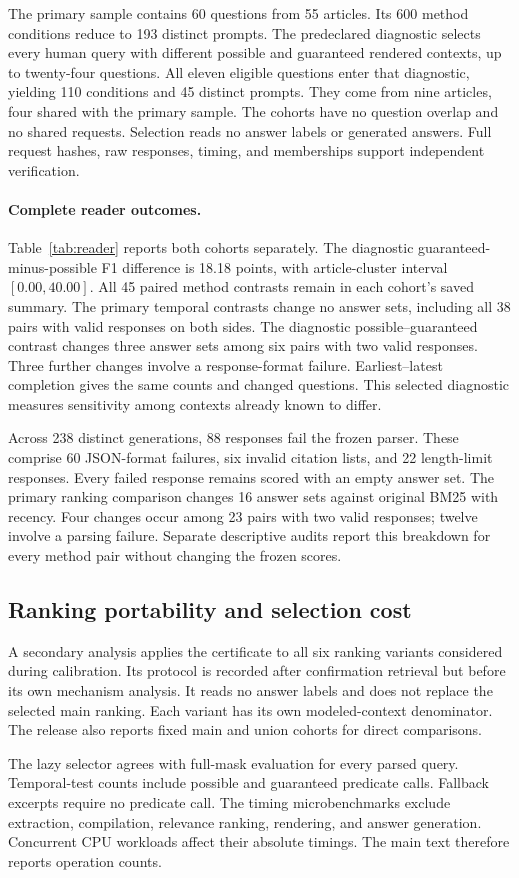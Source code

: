 The primary sample contains 60 questions from 55 articles.
Its 600 method conditions reduce to 193 distinct prompts.
The predeclared diagnostic selects every human query with different possible and guaranteed rendered contexts, up to twenty-four questions.
All eleven eligible questions enter that diagnostic, yielding 110 conditions and 45 distinct prompts.
They come from nine articles, four shared with the primary sample.
The cohorts have no question overlap and no shared requests.
Selection reads no answer labels or generated answers.
Full request hashes, raw responses, timing, and memberships support independent verification.


\paragraph{Complete reader outcomes.}
Table~\ref{tab:reader} reports both cohorts separately.
The diagnostic guaranteed-minus-possible F1 difference is 18.18 points, with article-cluster interval $[0.00,40.00]$.
All 45 paired method contrasts remain in each cohort's saved summary.
The primary temporal contrasts change no answer sets, including all 38 pairs with valid responses on both sides.
The diagnostic possible--guaranteed contrast changes three answer sets among six pairs with two valid responses.
Three further changes involve a response-format failure.
Earliest--latest completion gives the same counts and changed questions.
This selected diagnostic measures sensitivity among contexts already known to differ.

Across 238 distinct generations, 88 responses fail the frozen parser.
These comprise 60 JSON-format failures, six invalid citation lists, and 22 length-limit responses.
Every failed response remains scored with an empty answer set.
The primary ranking comparison changes 16 answer sets against original BM25 with recency.
Four changes occur among 23 pairs with two valid responses; twelve involve a parsing failure.
Separate descriptive audits report this breakdown for every method pair without changing the frozen scores.

\subsection{Ranking portability and selection cost}
A secondary analysis applies the certificate to all six ranking variants considered during calibration.
Its protocol is recorded after confirmation retrieval but before its own mechanism analysis.
It reads no answer labels and does not replace the selected main ranking.
Each variant has its own modeled-context denominator.
The release also reports fixed main and union cohorts for direct comparisons.

The lazy selector agrees with full-mask evaluation for every parsed query.
Temporal-test counts include possible and guaranteed predicate calls.
Fallback excerpts require no predicate call.
The timing microbenchmarks exclude extraction, compilation, relevance ranking, rendering, and answer generation.
Concurrent CPU workloads affect their absolute timings.
The main text therefore reports operation counts.

